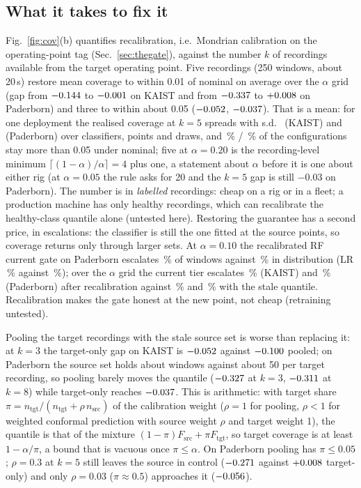 \documentclass{ifacconf}
\begin{document}
\subsection{What it takes to fix it}\label{sec:recal}
Fig.~\ref{fig:cov}(b) quantifies recalibration, i.e.\ Mondrian calibration on the operating-point tag (Sec.~\ref{sec:thegate}), against the number $k$ of recordings available from the target operating point. Five recordings (250 windows, about 20\,s) restore mean coverage to within 0.01 of nominal on average over the $\alpha$ grid (gap from $-0.144$ to $-0.001$ on KAIST and from $-0.337$ to $+0.008$ on Paderborn) and three to within about 0.05 ($-0.052$, $-0.037$). That is a mean: for one deployment the realised coverage at $k=5$ spreads with s.d.\ \spreadK{} (KAIST) and \spreadP{} (Paderborn) over classifiers, points and draws, and \belowK\,\% / \belowP\,\% of the configurations stay more than 0.05 under nominal; five at $\alpha=0.20$ is the recording-level minimum $\lceil(1-\alpha)/\alpha\rceil=4$ plus one, a statement about $\alpha$ before it is one about either rig (at $\alpha=0.05$ the rule asks for 20 and the $k=5$ gap is still $-0.03$ on Paderborn). The number is in \emph{labelled} recordings: cheap on a rig or in a fleet; a production machine has only healthy recordings, which can recalibrate the healthy-class quantile alone (untested here). Restoring the guarantee has a second price, in escalations: the classifier is still the one fitted at the source points, so coverage returns only through larger sets. At $\alpha=0.10$ the recalibrated RF current gate on Paderborn escalates \escTgtPrf\,\% of windows against \escInPrf\,\% in distribution (LR \escTgtPlr\,\% against \escInPlr\,\%); over the $\alpha$ grid the current tier escalates \escTgtMeanK\,\% (KAIST) and \escTgtMeanP\,\% (Paderborn) after recalibration against \escSrcMeanK\,\% and \escSrcMeanP\,\% with the stale quantile. Recalibration makes the gate honest at the new point, not cheap (retraining untested).

Pooling the target recordings with the stale source set is worse than replacing it: at $k=3$ the target-only gap on KAIST is $-0.052$ against $-0.100$ pooled; on Paderborn the source set holds about \srcCalP{} windows against about 50 per target recording, so pooling barely moves the quantile ($-0.327$ at $k=3$, $-0.311$ at $k=8$) while target-only reaches $-0.037$. This is arithmetic: with target share $\pi=n_{\text{tgt}}/(n_{\text{tgt}}+\rho\,n_{\text{src}})$ of the calibration weight ($\rho=1$ for pooling, $\rho<1$ for weighted conformal prediction with source weight $\rho$ and target weight 1), the quantile is that of the mixture $(1-\pi)F_{\text{src}}+\pi F_{\text{tgt}}$, so target coverage is at least $1-\alpha/\pi$, a bound that is vacuous once $\pi\le\alpha$. On Paderborn pooling has $\pi\le0.05$; $\rho=0.3$ at $k=5$ still leaves the source in control ($-0.271$ against $+0.008$ target-only) and only $\rho=0.03$ ($\pi\approx0.5$) approaches it ($-0.056$).
\end{document}
